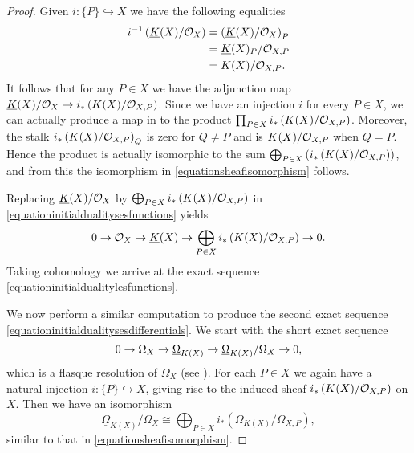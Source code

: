 \begin{cor}
\begin{proof}
    Given $i\colon \{P\} \hookrightarrow X$ we have the following equalities
        \begin{align*}
        i^{-1}\left(\underline{K}(X)/{\cal O}_X\right) & = \left(\underline{K}(X)/{\cal O}_X\right)_P \\
        & = \underline{K}(X)_P/{\cal O}_{X,P} \\
        & = K(X)/{\cal O}_{X,P}.
        \end{align*}
    It follows that for any $P \in X$ we have the adjunction map $\underline{K}(X)/{\cal O}_X \rightarrow i_* \left( K(X)/{\cal O}_{X,P} \right)$.
    Since we have an injection $i$ for every $P \in X$, we can actually produce a map in to the product $\prod_{P \in X} i_*\left(K(X)/{\cal O}_{X,P}\right)$.
    Moreover, the stalk $i_*\left( K(X)/{\cal O}_{X,P} \right)_Q$ is zero for $Q \neq P$ and is $K(X)/{\cal O}_{X,P}$ when $Q = P$.
    Hence the product is actually isomorphic to the sum $\bigoplus_{P \in X} \left( i_*\left(K(X)/{\cal O}_{X,P} \right)\right)$, and from this the isomorphism in \eqref{equationsheafisomorphism} follows.
    
    Replacing $\underline{K}(X)/{\cal O}_X$ by $\bigoplus_{P\in X} i_*\left(K(X)/{\cal O}_{X,P}\right)$ in \eqref{equationinitialdualitysesfunctions} yields
        \begin{equation}\label{equationshortexactsequencefunctionsdirectsum}
        0 \rightarrow {\cal O}_X \rightarrow \underline{K}(X) \rightarrow \bigoplus_{P \in X}i_* \left( K(X)/{\cal O}_{X,P} \right) \rightarrow 0.
        \end{equation}
    Taking cohomology we arrive at the exact sequence \eqref{equationinitialdualitylesfunctions}.
    
    We now perform a similar computation to produce the second exact sequence \eqref{equationinitialdualitysesdifferentials}.
    We start with the short exact sequence
        \[
        0 \rightarrow \Omega_X \rightarrow \underline{\Omega}_{K(X)} \rightarrow \underline{\Omega}_{K(X)}/\Omega_X \rightarrow 0,
        \]
    which is a flasque resolution of $\Omega_X$ (see \cite[Chap.\ II, ex.\ 1.16]{hart}).
    For each $P \in X$ we again have a natural injection $i \colon \{ P \} \hookrightarrow X$, giving rise to the induced sheaf $i_*\left( K(X)/{\cal O}_{X,P} \right)$ on $X$.
    Then we have an isomorphism
        \begin{equation*}%
        \underline{\Omega}_{K(X)}/\Omega_X \cong \bigoplus_{P \in X} i_* \left( \Omega_{K(X)}/\Omega_{X,P}\right),
        \end{equation*}
    similar to that in \eqref{equationsheafisomorphism}.


\end{proof}
\end{cor}
